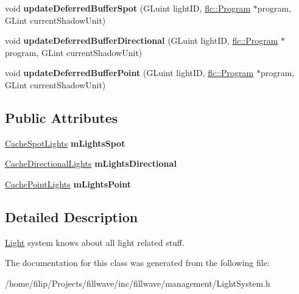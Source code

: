 \begin{DoxyCompactItemize}
\item 
void {\bfseries update\+Deferred\+Buffer\+Spot} (G\+Luint light\+ID, \hyperlink{classflw_1_1flc_1_1Program}{flc\+::\+Program} $\ast$program, G\+Lint current\+Shadow\+Unit)\hypertarget{classflw_1_1flf_1_1LightSystem_ab46894fd98f0ca50c2545d7c1845fb26}{}\label{classflw_1_1flf_1_1LightSystem_ab46894fd98f0ca50c2545d7c1845fb26}

\item 
void {\bfseries update\+Deferred\+Buffer\+Directional} (G\+Luint light\+ID, \hyperlink{classflw_1_1flc_1_1Program}{flc\+::\+Program} $\ast$program, G\+Lint current\+Shadow\+Unit)\hypertarget{classflw_1_1flf_1_1LightSystem_a8898bf26255c0aeef983943706df775b}{}\label{classflw_1_1flf_1_1LightSystem_a8898bf26255c0aeef983943706df775b}

\item 
void {\bfseries update\+Deferred\+Buffer\+Point} (G\+Luint light\+ID, \hyperlink{classflw_1_1flc_1_1Program}{flc\+::\+Program} $\ast$program, G\+Lint current\+Shadow\+Unit)\hypertarget{classflw_1_1flf_1_1LightSystem_a9311e0a1011ba6c1efda80d874fbcaac}{}\label{classflw_1_1flf_1_1LightSystem_a9311e0a1011ba6c1efda80d874fbcaac}

\end{DoxyCompactItemize}
\subsection*{Public Attributes}
\begin{DoxyCompactItemize}
\item 
\hyperlink{classflw_1_1flf_1_1TManager}{Cache\+Spot\+Lights} {\bfseries m\+Lights\+Spot}\hypertarget{classflw_1_1flf_1_1LightSystem_afb42372c19f612b0b825ba3ccd63cc58}{}\label{classflw_1_1flf_1_1LightSystem_afb42372c19f612b0b825ba3ccd63cc58}

\item 
\hyperlink{classflw_1_1flf_1_1TManager}{Cache\+Directional\+Lights} {\bfseries m\+Lights\+Directional}\hypertarget{classflw_1_1flf_1_1LightSystem_a59a23e29ca90a821d083f213ebc6450d}{}\label{classflw_1_1flf_1_1LightSystem_a59a23e29ca90a821d083f213ebc6450d}

\item 
\hyperlink{classflw_1_1flf_1_1TManager}{Cache\+Point\+Lights} {\bfseries m\+Lights\+Point}\hypertarget{classflw_1_1flf_1_1LightSystem_a92509acd5b371300c80f33241fbf9715}{}\label{classflw_1_1flf_1_1LightSystem_a92509acd5b371300c80f33241fbf9715}

\end{DoxyCompactItemize}


\subsection{Detailed Description}
\hyperlink{classflw_1_1flf_1_1Light}{Light} system knows about all light related stuff. 

The documentation for this class was generated from the following file\+:\begin{DoxyCompactItemize}
\item 
/home/filip/\+Projects/fillwave/inc/fillwave/management/Light\+System.\+h\end{DoxyCompactItemize}
